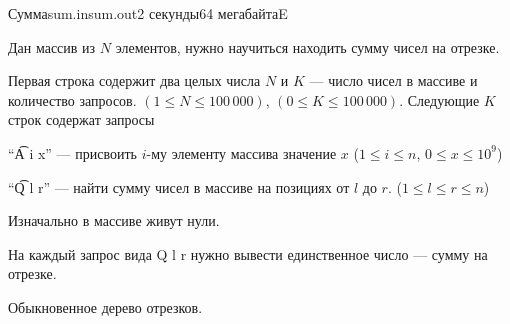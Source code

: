 \begin{problem}{Сумма}{sum.in}{sum.out}{2 секунды}{64 мегабайта}{E}

Дан массив из $N$ элементов, нужно научиться находить сумму чисел на отрезке.

\InputFile

Первая строка содержит два целых числа $N$ и $K$ --- число чисел в массиве и количество запросов.
$(1 \leq N \leq 100 \, 000)$, $(0 \leq K \leq 100 \, 000)$. Следующие $K$ строк содержат запросы

\begin{shortitems}
\item{``\t{A i x}'' --- присвоить $i$-му элементу массива значение $x$ ($1 \leq i \leq n$, $0 \leq x \leq 10^9$)}
\item{``\t{Q l r}'' --- найти сумму чисел в массиве на позициях от $l$ до $r$. ($1 \leq l \leq r \leq n$)}
\end{shortitems}

Изначально в массиве живут нули.

\OutputFile

На каждый запрос вида Q l r нужно вывести единственное число --- сумму на отрезке.

\Examples

\begin{example}
%
\end{example}

\Note

Обыкновенное дерево отрезков.

\end{problem}
